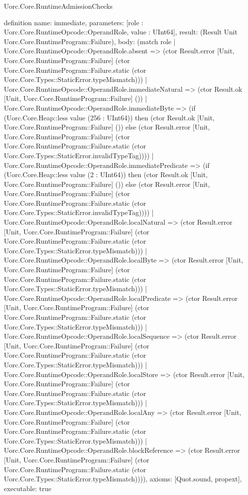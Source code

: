 \begin{lexlean}{Uorc.Core.RuntimeAdmissionChecks}
\begin{semanticmodule}
definition{
  name: immediate,
  parameters: [role : Uorc.Core.RuntimeOpcode::OperandRole, value : UInt64],
  result: (Result Unit Uorc.Core.RuntimeProgram::Failure),
  body: (match role
    | Uorc.Core.RuntimeOpcode::OperandRole.absent => (ctor Result.error [Unit, Uorc.Core.RuntimeProgram::Failure] (ctor Uorc.Core.RuntimeProgram::Failure.static (ctor Uorc.Core.Types::StaticError.typeMismatch)))
    | Uorc.Core.RuntimeOpcode::OperandRole.immediateNatural => (ctor Result.ok [Unit, Uorc.Core.RuntimeProgram::Failure] ())
    | Uorc.Core.RuntimeOpcode::OperandRole.immediateByte => (if (Uorc.Core.Heap::less value (256 : UInt64)) then (ctor Result.ok [Unit, Uorc.Core.RuntimeProgram::Failure] ()) else (ctor Result.error [Unit, Uorc.Core.RuntimeProgram::Failure] (ctor Uorc.Core.RuntimeProgram::Failure.static (ctor Uorc.Core.Types::StaticError.invalidTypeTag))))
    | Uorc.Core.RuntimeOpcode::OperandRole.immediatePredicate => (if (Uorc.Core.Heap::less value (2 : UInt64)) then (ctor Result.ok [Unit, Uorc.Core.RuntimeProgram::Failure] ()) else (ctor Result.error [Unit, Uorc.Core.RuntimeProgram::Failure] (ctor Uorc.Core.RuntimeProgram::Failure.static (ctor Uorc.Core.Types::StaticError.invalidTypeTag))))
    | Uorc.Core.RuntimeOpcode::OperandRole.localNatural => (ctor Result.error [Unit, Uorc.Core.RuntimeProgram::Failure] (ctor Uorc.Core.RuntimeProgram::Failure.static (ctor Uorc.Core.Types::StaticError.typeMismatch)))
    | Uorc.Core.RuntimeOpcode::OperandRole.localByte => (ctor Result.error [Unit, Uorc.Core.RuntimeProgram::Failure] (ctor Uorc.Core.RuntimeProgram::Failure.static (ctor Uorc.Core.Types::StaticError.typeMismatch)))
    | Uorc.Core.RuntimeOpcode::OperandRole.localPredicate => (ctor Result.error [Unit, Uorc.Core.RuntimeProgram::Failure] (ctor Uorc.Core.RuntimeProgram::Failure.static (ctor Uorc.Core.Types::StaticError.typeMismatch)))
    | Uorc.Core.RuntimeOpcode::OperandRole.localSequence => (ctor Result.error [Unit, Uorc.Core.RuntimeProgram::Failure] (ctor Uorc.Core.RuntimeProgram::Failure.static (ctor Uorc.Core.Types::StaticError.typeMismatch)))
    | Uorc.Core.RuntimeOpcode::OperandRole.localStore => (ctor Result.error [Unit, Uorc.Core.RuntimeProgram::Failure] (ctor Uorc.Core.RuntimeProgram::Failure.static (ctor Uorc.Core.Types::StaticError.typeMismatch)))
    | Uorc.Core.RuntimeOpcode::OperandRole.localAny => (ctor Result.error [Unit, Uorc.Core.RuntimeProgram::Failure] (ctor Uorc.Core.RuntimeProgram::Failure.static (ctor Uorc.Core.Types::StaticError.typeMismatch)))
    | Uorc.Core.RuntimeOpcode::OperandRole.blockReference => (ctor Result.error [Unit, Uorc.Core.RuntimeProgram::Failure] (ctor Uorc.Core.RuntimeProgram::Failure.static (ctor Uorc.Core.Types::StaticError.typeMismatch)))),
  axioms: [Quot.sound, propext],
  executable: true
}


\end{semanticmodule}
\end{lexlean}

